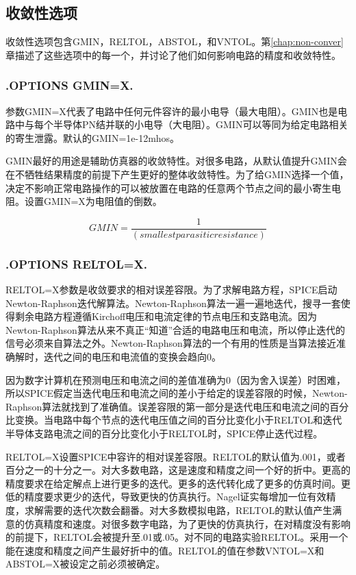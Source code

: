 \subsection{收敛性选项}
收敛性选项包含GMIN，RELTOL，ABSTOL，和VNTOL。第\ref{chap:non-conver}章描述了这些选项中的每一个，并讨论了他们如何影响电路的精度和收敛特性。

\subsubsection{.OPTIONS GMIN=X.}
参数GMIN=X代表了电路中任何元件容许的最小电导（最大电阻）。GMIN也是电路中与每个半导体PN结并联的小电导（大电阻）。GMIN可以等同为给定电路相关的寄生泄露。默认的GMIN=1e-12mhos。

GMIN最好的用途是辅助仿真器的收敛特性。对很多电路，从默认值提升GMIN会在不牺牲结果精度的前提下产生更好的整体收敛特性。为了给GMIN选择一个值，决定不影响正常电路操作的可以被放置在电路的任意两个节点之间的最小寄生电阻。设置GMIN=X为电阻值的倒数。

\begin{equation}
    GMIN=\frac{1}{(smallest parasitic resistance)}
\end{equation}

\subsubsection{.OPTIONS RELTOL=X.}
RELTOL=X参数是收敛要求的相对误差容限。为了求解电路方程，SPICE启动Newton-Raphson迭代解算法。Newton-Raphson算法一遍一遍地迭代，搜寻一套使得剩余电路方程遵循Kirchoff电压和电流定律的节点电压和支路电流。因为Newton-Raphson算法从来不真正“知道”合适的电路电压和电流，所以停止迭代的信号必须来自算法之外。Newton-Raphson算法的一个有用的性质是当算法接近准确解时，迭代之间的电压和电流值的变换会趋向0。

因为数字计算机在预测电压和电流之间的差值准确为0（因为舍入误差）时困难，所以SPICE假定当迭代电压和电流之间的差小于给定的误差容限的时候，Newton-Raphson算法就找到了准确值。误差容限的第一部分是迭代电压和电流之间的百分比变换。当电路中每个节点的迭代电压值之间的百分比变化小于RELTOL和迭代半导体支路电流之间的百分比变化小于RELTOL时，SPICE停止迭代过程。

RELTOL=X设置SPICE中容许的相对误差容限。RELTOL的默认值为.001，或者百分之一的十分之一。对大多数电路，这是速度和精度之间一个好的折中。更高的精度要求在给定解点上进行更多的迭代。更多的迭代转化成了更多的仿真时间。更低的精度要求更少的迭代，导致更快的仿真执行。Nagel证实每增加一位有效精度，求解需要的迭代次数会翻番\cite{chap6-2}。对大多数模拟电路，RELTOL的默认值产生满意的仿真精度和速度。对很多数字电路，为了更快的仿真执行，在对精度没有影响的前提下，RELTOL会被提升至.01或.05。对不同的电路实验RELTOL。采用一个能在速度和精度之间产生最好折中的值。RELTOL的值在参数VNTOL=X和ABSTOL=X被设定之前必须被确定。

